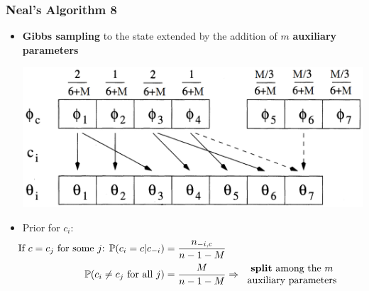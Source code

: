\begin{frame}
	\frametitle{Neal's Algorithm 8}
	\begin{itemize}
		\item \textbf{Gibbs sampling} to the state extended by the addition of $m$ \textbf{auxiliary parameters} \\
        \begin{center}
        	\includegraphics[scale=0.35]{etc/neal8.png}
        \end{center}
		
        \item Prior for $c_{i}$:
            \begin{align*}
            \hspace{-25pt}
            \vspace{-12pt}
                \text{If $c=c_j$ for some $j$: } \PP(c_{i}=c | c_{-i}) &= \frac{n_{-i,c}}{n-1-M}  \\
                \PP(c_{i}\neq c_{j} \text{ for all } j) &=\frac{M }{n-1-M}  \Rightarrow 
                \begin{tabular}{c}
                \textbf{split} among the $m$ \\
                auxiliary parameters 
                \end{tabular}
            \end{align*}	
	\end{itemize}
\end{frame}


